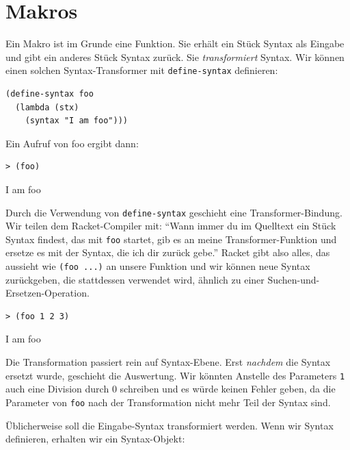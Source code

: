 \section{Makros} 
\label{makros}

Ein Makro ist im Grunde eine Funktion. Sie erhält ein Stück Syntax als Eingabe und gibt ein anderes Stück Syntax zurück. Sie \textit{transformiert} Syntax. Wir können einen solchen Syntax-Transformer mit \texttt{define-syntax} definieren:

\begin{lstlisting}
(define-syntax foo
  (lambda (stx)
    (syntax "I am foo")))
\end{lstlisting}

Ein Aufruf von foo ergibt dann:

\begin{lstlisting}
> (foo)
\end{lstlisting}
{\routput {\qq}I am foo{\qq}}

Durch die Verwendung von \texttt{define-syntax} geschieht eine Transformer-Bindung. Wir teilen dem Racket-Compiler mit: ``Wann immer du im Quelltext ein Stück Syntax findest, das mit \texttt{foo} startet, gib es an meine Transformer-Funktion und ersetze es mit der Syntax, die ich dir zurück gebe.'' Racket gibt also alles, das aussieht wie \texttt{(foo ...)} an unsere Funktion und wir können neue Syntax zurückgeben, die stattdessen verwendet wird, ähnlich zu einer Suchen-und-Ersetzen-Operation.

\begin{lstlisting}
> (foo 1 2 3)
\end{lstlisting}
{\routput {\qq}I am foo\qq}

Die Transformation passiert rein auf Syntax-Ebene. Erst \textit{nachdem} die Syntax ersetzt wurde, geschieht die Auswertung. Wir könnten Anstelle des Parameters \texttt{1} auch eine Division durch 0 schreiben und es würde keinen Fehler geben, da die Parameter von \texttt{foo} nach der Transformation nicht mehr Teil der Syntax sind.

Üblicherweise soll die Eingabe-Syntax transformiert werden. Wenn wir Syntax definieren, erhalten wir ein Syntax-Objekt:

